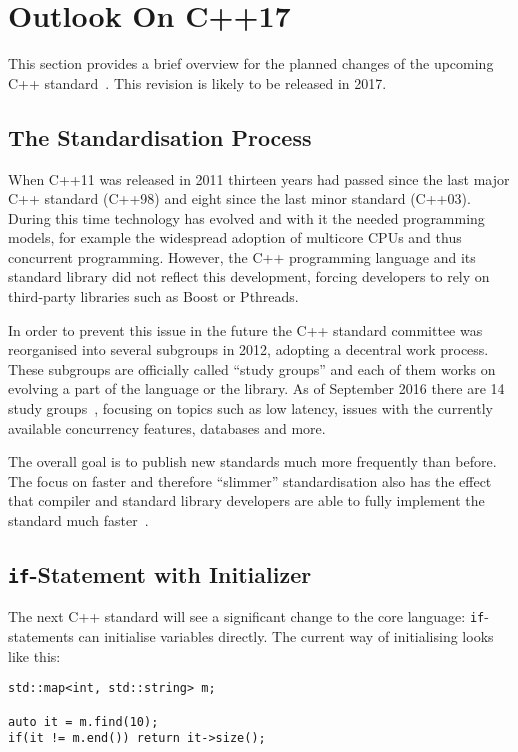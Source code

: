 \section{Outlook On C++17}\label{cpp17}

This section provides a brief overview for the planned changes of the upcoming C++ standard~\cite{cpp17std}. This revision is likely to be released in 2017.

\subsection{The Standardisation Process}\label{cpp17:standardisation}

When C++11 was released in 2011 thirteen years had passed since the last major C++ standard (C++98) and eight since the last minor standard (C++03). During this time technology has evolved and with it the needed programming models, for example the widespread adoption of multicore CPUs and thus concurrent programming. However, the C++ programming language and its standard library did not reflect this development, forcing developers to rely on third-party libraries such as Boost or Pthreads.

In order to prevent this issue in the future the C++ standard committee was reorganised into several subgroups in 2012, adopting a decentral work process. These subgroups are officially called ``study groups'' and each of them works on evolving a part of the language or the library. As of September 2016 there are 14 study groups~\cite{cpp_committee}, focusing on topics such as low latency, issues with the currently available concurrency features, databases and more.

The overall goal is to publish new standards much more frequently than before. The focus on faster and therefore ``slimmer'' standardisation also has the effect that compiler and standard library developers are able to fully implement the standard much faster~\cite{cpp14_announcement}.

\subsection{\texttt{if}-Statement with Initializer}\label{cpp17:if_init}

The next C++ standard will see a significant change to the core language: \texttt{if}-statements can initialise variables directly. The current way of initialising looks like this:

\begin{verbatim}
std::map<int, std::string> m;

auto it = m.find(10);
if(it != m.end()) return it->size();
\end{verbatim}


